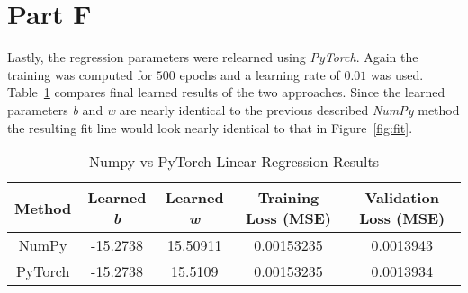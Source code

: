 \newpage
\section{Part F}
\label{sec:sec_f}

Lastly, the regression parameters were relearned using \textit{PyTorch}. Again the training was computed for $500$ epochs and a learning rate of $0.01$ was used. Table~\ref{tbl:cmr} compares final learned results of the two approaches. Since the learned parameters \textit{b} and \textit{w} are nearly identical to the previous described \textit{NumPy} method the resulting fit line would look nearly identical to that in Figure~\ref{fig:fit}. 

\begin{table}[h!]
	\centering
\begin{tabular}{||c|c|c|c|c||}
		\hline
		Method & Learned \textit{b} & Learned \textit{w} & Training Loss (MSE) & Validation Loss (MSE) \\
		\hline
		NumPy & -15.2738 & 15.50911 & 0.00153235 & 0.0013943 \\
		PyTorch & -15.2738 & 15.5109 & 0.00153235 & 0.0013934\\
		\hline
\end{tabular}
\caption{Numpy vs PyTorch Linear Regression Results}
\label{tbl:cmr}
\end{table}

